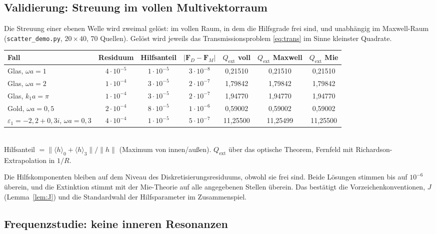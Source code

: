 \documentclass[11pt, a4paper]{article}
\newcommand{\mvec}[1]{\boldsymbol{#1}}
\newcommand{\grade}[2]{\langle #1\rangle_{#2}}
\theoremstyle{plain}
\theoremstyle{definition}
\begin{document}
\subsection{Validierung: Streuung im vollen Multivektorraum}

Die Streuung einer ebenen Welle wird zweimal gelöst: im vollen Raum, in dem die
Hilfsgrade frei sind, und unabhängig im Maxwell-Raum
(\texttt{scatter\_demo.py}, $20\times40$, 70 Quellen). Gelöst wird jeweils das
Transmissionsproblem \eqref{eq:trans} im Sinne kleinster Quadrate.

\begin{center}\footnotesize\setlength{\tabcolsep}{3.5pt}
\begin{tabular}{lcccccc}
\toprule
Fall & Residuum & Hilfsanteil & $|\mvec{F}_D-\mvec{F}_M|$ & $Q_{\mathrm{ext}}$ voll & $Q_{\mathrm{ext}}$ Maxwell & $Q_{\mathrm{ext}}$ Mie\\
\midrule
Glas, $\omega a=1$ & $4\cdot10^{-5}$ & $1\cdot10^{-5}$ & $3\cdot10^{-8}$ & 0,21510 & 0,21510 & 0,21510\\
Glas, $\omega a=2$ & $1\cdot10^{-4}$ & $3\cdot10^{-5}$ & $2\cdot10^{-7}$ & 1,79842 & 1,79842 & 1,79842\\
Glas, $k_1a=\pi$ & $1\cdot10^{-4}$ & $3\cdot10^{-5}$ & $2\cdot10^{-7}$ & 1,94770 & 1,94770 & 1,94770\\
Gold, $\omega a=0{,}5$ & $2\cdot10^{-4}$ & $8\cdot10^{-5}$ & $1\cdot10^{-6}$ & 0,59002 & 0,59002 & 0,59002\\
$\varepsilon_1=-2{,}2+0{,}3i$, $\omega a=0{,}3$ & $4\cdot10^{-4}$ & $1\cdot10^{-5}$ & $5\cdot10^{-7}$ & 11,25500 & 11,25499 & 11,25500\\
\bottomrule
\end{tabular}\\[2pt]
{\footnotesize Hilfsanteil $=\|\grade{h}{0}+\grade{h}{3}\|/\|h\|$ (Maximum von innen/außen).
$Q_{\mathrm{ext}}$ über das optische Theorem, Fernfeld mit Richardson-Extrapolation in $1/R$.}
\end{center}

Die Hilfskomponenten bleiben auf dem Niveau des Diskretisierungsresiduums, obwohl
sie frei sind. Beide Lösungen stimmen bis auf $10^{-6}$ überein, und die
Extinktion stimmt mit der Mie-Theorie auf alle angegebenen Stellen überein.
Das bestätigt die Vorzeichenkonventionen, $J$ (Lemma~\ref{lem:J}) und die
Standardwahl der Hilfsparameter im Zusammenspiel.

\subsection{Frequenzstudie: keine inneren Resonanzen}
\end{document}
